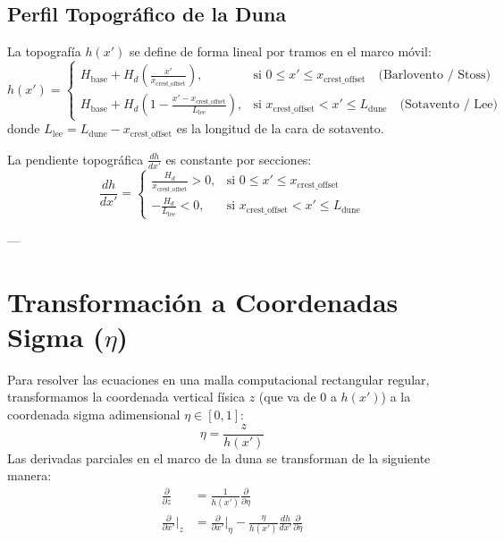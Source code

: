 \documentclass[11pt,a4paper]{article}
\begin{document}
\subsection{Perfil Topográfico de la Duna}
La topografía $h(x')$ se define de forma lineal por tramos en el marco móvil:
\begin{equation}
h(x') = \begin{cases} 
H_{\text{base}} + H_d \left( \frac{x'}{x_{\text{crest\_offset}}} \right), & \text{si } 0 \le x' \le x_{\text{crest\_offset}} \quad \text{(Barlovento / Stoss)} \\
H_{\text{base}} + H_d \left( 1 - \frac{x' - x_{\text{crest\_offset}}}{L_{\text{lee}}} \right), & \text{si } x_{\text{crest\_offset}} < x' \le L_{\text{dune}} \quad \text{(Sotavento / Lee)}
\end{cases}
\end{equation}
donde $L_{\text{lee}} = L_{\text{dune}} - x_{\text{crest\_offset}}$ es la longitud de la cara de sotavento.

La pendiente topográfica $\frac{dh}{dx'}$ es constante por secciones:
\begin{equation}
\frac{dh}{dx'} = \begin{cases} 
\frac{H_d}{x_{\text{crest\_offset}}} > 0, & \text{si } 0 \le x' \le x_{\text{crest\_offset}} \\
-\frac{H_d}{L_{\text{lee}}} < 0, & \text{si } x_{\text{crest\_offset}} < x' \le L_{\text{dune}}
\end{cases}
\end{equation}

---

\section{Transformación a Coordenadas Sigma (\(\eta\))}
Para resolver las ecuaciones en una malla computacional rectangular regular, transformamos la coordenada vertical física $z$ (que va de $0$ a $h(x')$) a la coordenada sigma adimensional $\eta \in [0, 1]$:
\begin{equation}
\eta = \frac{z}{h(x')}
\end{equation}
Las derivadas parciales en el marco de la duna se transforman de la siguiente manera:
\begin{align}
\frac{\partial}{\partial z} &= \frac{1}{h(x')} \frac{\partial}{\partial \eta} \\
\frac{\partial}{\partial x'}\Big|_z &= \frac{\partial}{\partial x'}\Big|_{\eta} - \frac{\eta}{h(x')} \frac{dh}{dx'} \frac{\partial}{\partial \eta}
\end{align}
\end{document}
